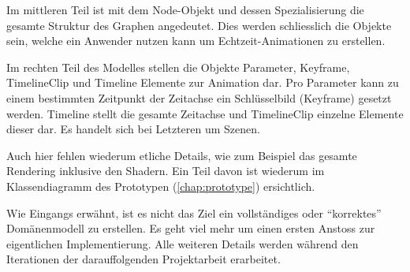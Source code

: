 Im mittleren Teil ist mit dem Node-Objekt und dessen Spezialisierung die
gesamte Struktur des Graphen angedeutet. Dies werden schliesslich die Objekte
sein, welche ein Anwender nutzen kann um Echtzeit-Animationen zu erstellen.

Im rechten Teil des Modelles stellen die Objekte Parameter, Keyframe,
TimelineClip und Timeline Elemente zur Animation dar. Pro Parameter kann zu
einem bestimmten Zeitpunkt der Zeitachse ein Schlüsselbild (Keyframe) gesetzt
werden. Timeline stellt die gesamte Zeitachse und TimelineClip einzelne
Elemente dieser dar. Es handelt sich bei Letzteren um Szenen.

Auch hier fehlen wiederum etliche Details, wie zum Beispiel das gesamte
Rendering inklusive den Shadern. Ein Teil davon ist wiederum im Klassendiagramm
des Prototypen (\ref{chap:prototype}) ersichtlich.

Wie Eingangs erwähnt, ist es nicht das Ziel ein vollständiges oder
``korrektes'' Domänenmodell zu erstellen. Es geht viel mehr um einen ersten
Anstoss zur eigentlichen Implementierung. Alle weiteren Details werden während
den Iterationen der darauffolgenden Projektarbeit erarbeitet.
